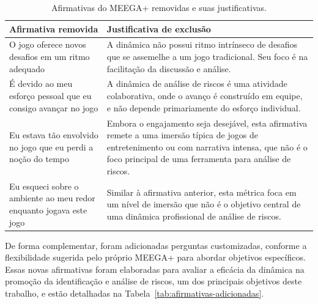 \documentclass[
	12pt,
	openright,
	twoside,
	a4paper,
	english,
	brazil
	]{abntex2}
\begin{document}
\begin{table}[h!]
  \centering
  \caption{Afirmativas do MEEGA+ removidas e suas justificativas.}
  \label{tab:afirmativas-removidas}
  \begin{tabular}{|p{}|p{}|}
  \hline
  \textbf{Afirmativa removida} & \textbf{Justificativa de exclusão} \\ \hline
  O jogo oferece novos desafios em um ritmo adequado & A dinâmica não possui ritmo intrínseco de desafios que se assemelhe a um jogo tradicional. Seu foco é na facilitação da discussão e análise. \\ \hline
  É devido ao meu esforço pessoal que eu consigo avançar no jogo & A dinâmica de análise de riscos é uma atividade colaborativa, onde o avanço é construído em equipe, e não depende primariamente do esforço individual. \\ \hline
  Eu estava tão envolvido no jogo que eu perdi a noção do tempo & Embora o engajamento seja desejável, esta afirmativa remete a uma imersão típica de jogos de entretenimento ou com narrativa intensa, que não é o foco principal de uma ferramenta para análise de riscos. \\ \hline
  Eu esqueci sobre o ambiente ao meu redor enquanto jogava este jogo & Similar à afirmativa anterior, esta métrica foca em um nível de imersão que não é o objetivo central de uma dinâmica profissional de análise de riscos. \\ \hline
  \end{tabular}
\end{table}

De forma complementar, foram adicionadas perguntas customizadas, conforme a flexibilidade sugerida pelo próprio MEEGA+ para abordar objetivos específicos. Essas novas afirmativas foram elaboradas para avaliar a eficácia da dinâmica na promoção da identificação e análise de riscos, um dos principais objetivos deste trabalho, e estão detalhadas na Tabela~\ref{tab:afirmativas-adicionadas}.
\end{document}

